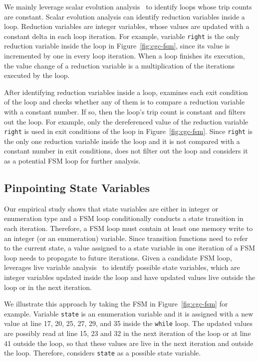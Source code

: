 We mainly leverage scalar evolution analysis~\cite{scalar-1,scalar-2,scalar-3} 
to identify loops whose trip counts are constant. 
Scalar evolution analysis can identify reduction variables inside a loop.
Reduction variables are integer variables, 
whose values are updated 
with a constant delta in each loop iteration. 
For example, variable \texttt{right} is the only reduction 
variable inside the loop in Figure~\ref{fig:cgc-fsm}, 
since its value is incremented by one in every loop iteration.  
When a loop finishes its execution, the value change of a 
reduction variable is a multiplication of 
the iterations executed by the loop. 

After identifying reduction variables inside a loop,
\Tool{} examines each exit condition of the loop and checks whether 
any of them is to compare 
a reduction variable with a constant number. 
If so, then the loop’s trip count is constant and \Tool{} filters out the loop. 
For example, only the dereferenced value of the reduction variable \texttt{right}
is used in exit conditions of the loop in Figure~\ref{fig:cgc-fsm}. 
Since \texttt{right} is the only one reduction variable inside the loop
and it is not compared with a constant number in exit conditions, 
\Tool{} does not filter out the loop and considers it 
as a potential FSM loop for further analysis. 


\subsection{Pinpointing State Variables}
\label{sec:variable}
Our empirical study shows that state variables are either in integer or enumeration type
and a FSM loop conditionally conducts a state transition in each iteration. 
Therefore, a FSM loop must contain at least one memory write to an integer 
(or an enumeration) variable. 
Since transition functions need to refer to the current state, 
a value assigned to a state variable in one iteration of a FSM loop needs 
to propagate to future iterations.
Given a candidate FSM loop, 
\Tool{} leverages live variable 
analysis~\cite{live-analysis} to 
identify possible state variables, which are integer variables 
updated inside the loop and have updated values live outside the loop 
or in the next iteration. 


We illustrate this approach by taking the FSM 
in Figure~\ref{fig:cgc-fsm} for example. 
Variable \texttt{state} is an enumeration variable and it is assigned 
with a new value at 
line 17, 20, 25, 27, 29, and 35 inside the \texttt{while} loop. 
The updated values are possibly read at line 15, 23 and 32 
in the next iteration of the loop or at line 41 outside the loop, 
so that these values are live in the next iteration and outside the loop. 
Therefore, \Tool{} considers \texttt{state} as a possible 
state variable.  


